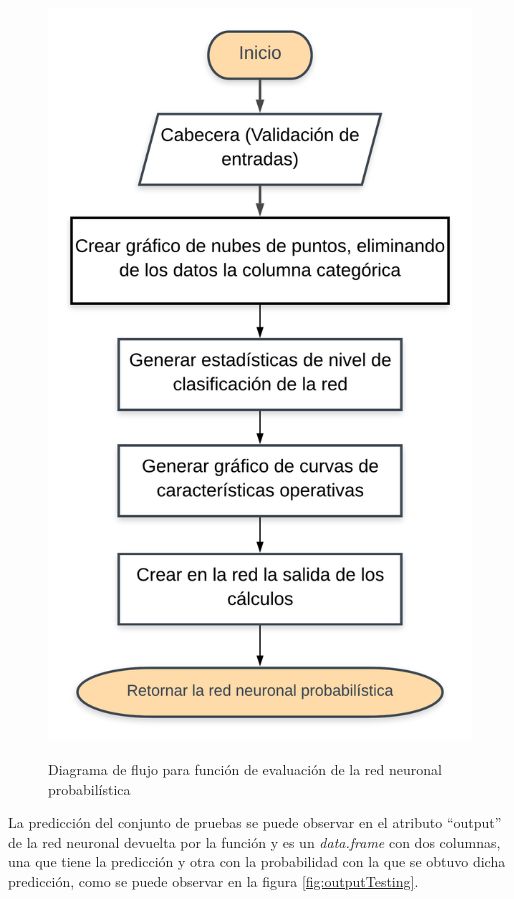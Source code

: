 \begin{figure}[h!]
	\caption{Diagrama de flujo para función de evaluación de la red neuronal probabilística}
	\centering
	\includegraphics[scale=0.8]{evaluate.png}
	\label{fig:evaluate}
\end{figure}

	La predicción del conjunto de pruebas se puede observar en el atributo “output” de la red neuronal devuelta por la función y es un \textit{data.frame} con dos columnas, una que tiene la predicción y otra con la probabilidad con la que se obtuvo dicha predicción, como se puede observar en la figura \ref{fig:outputTesting}. \\
	
